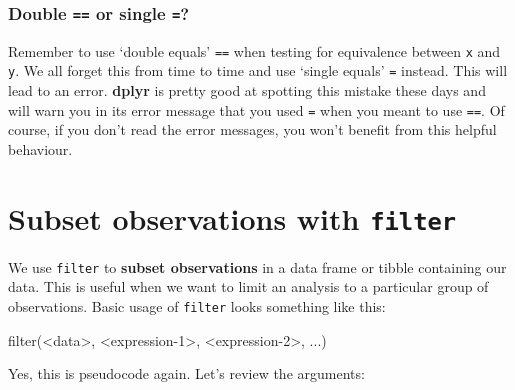 \documentclass[
]{book}
\newenvironment{Shaded}{\begin{snugshade}}{\end{snugshade}}
\newcommand{\DecValTok}[1]{\textcolor[rgb]{0.00,0.00,0.81}{#1}}
\newcommand{\FunctionTok}[1]{\textcolor[rgb]{0.00,0.00,0.00}{#1}}
\newcommand{\NormalTok}[1]{#1}
\newcommand{\SpecialCharTok}[1]{\textcolor[rgb]{0.00,0.00,0.00}{#1}}
\newenvironment{greybox}{
  \definecolor{shadecolor}{rgb}{0.95,0.95,0.95}  %
  \color{black}
  \begin{shaded}}
 {\end{shaded}}
\newenvironment{infobox}[1]
  {
  \begin{itemize}
  \renewcommand{\labelitemi}{
    \raisebox{-.7\height}[0pt][0pt]{
      {\setkeys{Gin}{width=3em,keepaspectratio}
        \texttt{[image: images/\#1]}}
    }
  }
  \setlength{\fboxsep}{1em}
  \begin{greybox}
  \item
  }
  {
  \end{greybox}
  \end{itemize}
  }
\begin{document}
\begin{infobox}{warning}

\hypertarget{double-or-single}{%
\subsubsection*{\texorpdfstring{Double \texttt{==} or single \texttt{=}?}{Double == or single =?}}\label{double-or-single}}

Remember to use `double equals' \texttt{==} when testing for equivalence between \texttt{x} and \texttt{y}. We all forget this from time to time and use `single equals' \texttt{=} instead. This will lead to an error. \textbf{dplyr} is pretty good at spotting this mistake these days and will warn you in its error message that you used \texttt{=} when you meant to use \texttt{==}. Of course, if you don't read the error messages, you won't benefit from this helpful behaviour.

\end{infobox}

\hypertarget{subset-observations-with-filter}{%
\section{\texorpdfstring{Subset observations with \texttt{filter}}{Subset observations with filter}}\label{subset-observations-with-filter}}

We use \texttt{filter} to \textbf{subset observations} in a data frame or tibble containing our data. This is useful when we want to limit an analysis to a particular group of observations. Basic usage of \texttt{filter} looks something like this:

\begin{Shaded}
\begin{Highlighting}[]
\FunctionTok{filter}\NormalTok{(}\SpecialCharTok{\textless{}}\NormalTok{data}\SpecialCharTok{\textgreater{}}\NormalTok{, }\SpecialCharTok{\textless{}}\NormalTok{expression}\DecValTok{{-}1}\SpecialCharTok{\textgreater{}}\NormalTok{, }\SpecialCharTok{\textless{}}\NormalTok{expression}\DecValTok{{-}2}\SpecialCharTok{\textgreater{}}\NormalTok{, ...)}
\end{Highlighting}
\end{Shaded}

Yes, this is pseudocode again. Let's review the arguments:
\end{document}
